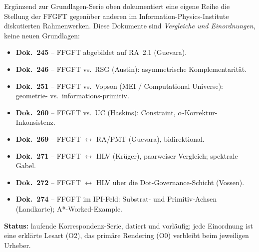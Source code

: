 	Ergänzend zur Grundlagen-Serie oben dokumentiert eine eigene Reihe die Stellung der
	FFGFT gegenüber anderen im Information-Physics-Institute diskutierten Rahmenwerken.
	Diese Dokumente sind \emph{Vergleiche und Einordnungen}, keine neuen Grundlagen:
	\begin{itemize}
		\item \textbf{Dok.~245} -- FFGFT abgebildet auf RA~2.1 (Guevara).
		\item \textbf{Dok.~246} -- FFGFT vs.\ RSG (Austin): asymmetrische Komplementarität.
		\item \textbf{Dok.~251} -- FFGFT vs.\ Vopson (MEI / Computational Universe): geometrie- vs.\ informations-primitiv.
		\item \textbf{Dok.~260} -- FFGFT vs.\ UC (Haskins): Constraint, $\alpha$-Korrektur-Inkonsistenz.
		\item \textbf{Dok.~269} -- FFGFT $\leftrightarrow$ RA/PMT (Guevara), bidirektional.
		\item \textbf{Dok.~271} -- FFGFT $\leftrightarrow$ HLV (Krüger), paarweiser Vergleich; spektrale Gabel.
		\item \textbf{Dok.~272} -- FFGFT $\leftrightarrow$ HLV über die Dot-Governance-Schicht (Vossen).
		\item \textbf{Dok.~274} -- FFGFT im IPI-Feld: Substrat- und Primitiv-Achsen (Landkarte); A*-Worked-Example.
	\end{itemize}
	\textbf{Status:} laufende Korrespondenz-Serie, datiert und vorläufig; jede Einordnung ist eine
	erklärte Lesart (O2), das primäre Rendering (O0) verbleibt beim jeweiligen Urheber.
